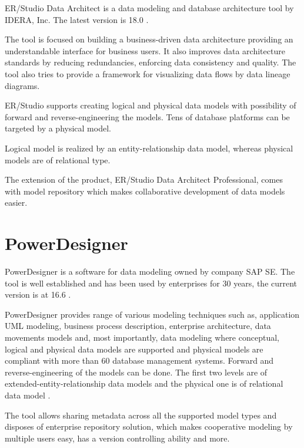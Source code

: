 ER/Studio Data Architect is a data modeling and database architecture tool by IDERA, Inc. 
The latest version is 18.0 \cite{ErStudio}.

The tool is focused on building a business-driven data architecture providing an understandable interface for business users. It also improves data architecture standards by reducing redundancies, enforcing data consistency and quality.
The tool also tries to provide a framework for visualizing data flows by data lineage diagrams. 

ER/Studio supports creating logical and physical data models with possibility of forward and reverse-engineering the models. Tens of database platforms can be targeted by a physical model.

Logical model is realized by an entity-relationship data model, whereas physical models are of relational type.

The  extension of the product, ER/Studio Data Architect Professional, comes with model repository which makes collaborative development of data models easier. 

\section{PowerDesigner}

PowerDesigner is a software for data modeling owned by company SAP SE. The tool is well established and has been used by enterprises for 30 years, the current version is at 16.6 \cite{PowerDesignerHistory}.

PowerDesigner provides range of various modeling techniques such as, application UML modeling, business process description, enterprise architecture, data movements models and, most importantly, data modeling where conceptual, logical and physical data models are supported and physical models are compliant with more than 60 database management systems.
Forward and reverse-engineering of the models can be done.
The first two levels are of extended-entity-relationship data models and the physical one is of relational data model \cite{PowerDesignerFeatures}.

The tool allows sharing metadata across all the supported model types and disposes of enterprise repository solution, which makes cooperative modeling by multiple users easy, has a version controlling ability and more.